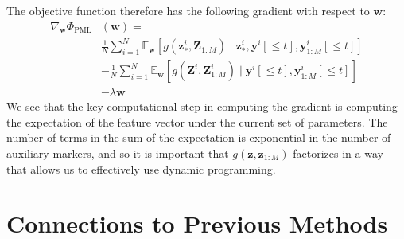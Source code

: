 \documentclass[12pt]{article}
\newcommand{\E}{\mathbb{E}}
\newcommand{\given}{\mid}
\begin{document}
The objective function therefore has the following gradient with respect to $\bm{w}$:
\begin{align}
\nabla_{\bm{w}} \Phi_{\text{PML}} & (\bm{w}) = \\
	&\frac{1}{N} \sum_{i=1}^N \E_{\bm{w}} \left[ g(\bm{z}^i_*, \bm{Z}_{1:M}) \given \bm{z}^i_*, \bm{y}^i[\le t], \bm{y}^i_{1:M}[\le t] \right] \\
	&- \frac{1}{N} \sum_{i=1}^N \E_{\bm{w}} \left[ g(\bm{Z}^i, \bm{Z}^i_{1:M}) \given \bm{y}^i[\le t], \bm{y}^i_{1:M}[\le t] \right] \\
	&- \lambda \bm{w}
\end{align}
We see that the key computational step in computing the gradient is computing the expectation of the feature vector under the current set of parameters. The number of terms in the sum of the expectation is exponential in the number of auxiliary markers, and so it is important that $g(\bm{z}, \bm{z}_{1:M})$ factorizes in a way that allows us to effectively use dynamic programming.


\section{Connections to Previous Methods}
\end{document}
